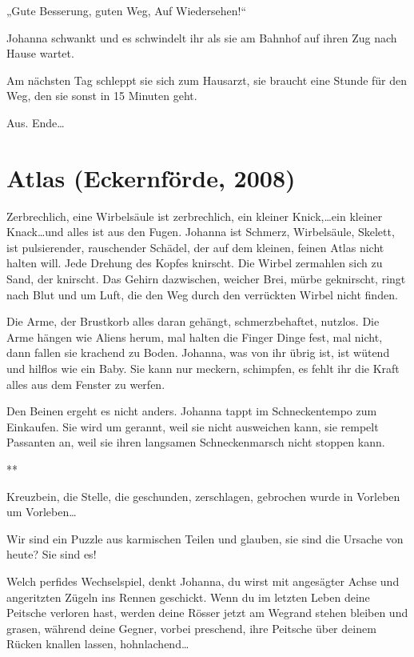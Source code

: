 \documentclass[10pt,titlepage,a5paper]{book}
\newcommand{\sterne}{\par{\centering ***\par}}
\begin{document}
„Gute Besserung, guten Weg, Auf Wiedersehen!“

Johanna schwankt und es schwindelt ihr als sie am Bahnhof auf ihren Zug nach Hause wartet.

Am nächsten Tag schleppt sie sich zum Hausarzt, sie braucht eine Stunde für den Weg, den sie sonst in 15 Minuten geht.

Aus. Ende\dots 



\section*{Atlas (Eckernförde, 2008)}



Zerbrechlich, eine Wirbelsäule ist zerbrechlich, ein kleiner Knick,\dots  \-ein kleiner Knack\dots  und alles ist aus den Fugen. 
Johanna ist Schmerz, Wirbelsäule, Skelett, ist pulsierender, rauschender Schädel, der auf dem kleinen, feinen Atlas nicht halten will. Jede Drehung des Kopfes knirscht. Die Wirbel zermahlen sich zu Sand, der knirscht. Das Gehirn dazwischen, weicher Brei, mürbe geknirscht, ringt nach Blut und um Luft, die den Weg durch den verrückten Wirbel nicht finden.

Die Arme, der Brustkorb alles daran gehängt, schmerzbehaftet, nutzlos. Die Arme hängen wie Aliens herum, mal halten die Finger Dinge fest, mal nicht, dann fallen sie krachend zu Boden. Johanna, was von ihr übrig ist, ist wütend und hilflos wie ein Baby. Sie kann nur meckern, schimpfen, es fehlt ihr die Kraft alles aus dem Fenster zu werfen. 

Den Beinen ergeht es nicht anders. Johanna tappt im Schneckentempo zum Einkaufen. Sie wird um gerannt, weil sie nicht ausweichen kann, sie rempelt Passanten an, weil sie ihren langsamen Schneckenmarsch nicht stoppen kann. 

\sterne

Kreuzbein, die Stelle, die geschunden, zerschlagen, gebrochen wurde in Vorleben um Vorleben\dots 

Wir sind ein Puzzle aus karmischen Teilen und glauben, sie sind die Ursache von heute? Sie sind es!

Welch perfides Wechselspiel, denkt Johanna, du wirst mit ange\-sägter Achse und angeritzten Zügeln ins Rennen geschickt. Wenn du im letzten Leben deine Peitsche verloren hast, werden deine Rösser jetzt am Wegrand stehen bleiben und grasen, während deine Gegner, vorbei preschend, ihre Peitsche über deinem Rücken knallen lassen, hohnlachend\dots 
\end{document}
